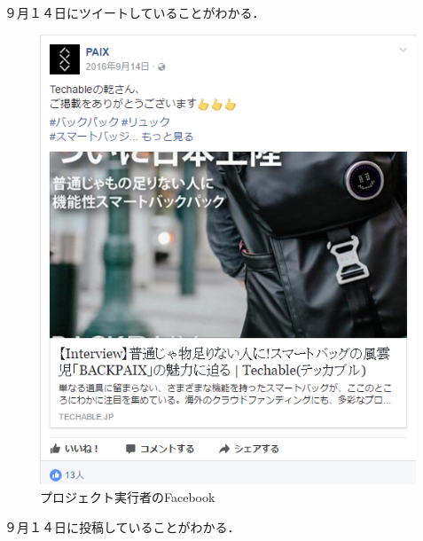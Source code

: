 ９月１４日にツイートしていることがわかる．

\begin{figure}[H]
\centering
\includegraphics[width=16cm]{chousa5.PNG}
\caption{プロジェクト実行者のFacebook}\label{サンプル図}
\end{figure}

９月１４日に投稿していることがわかる．


